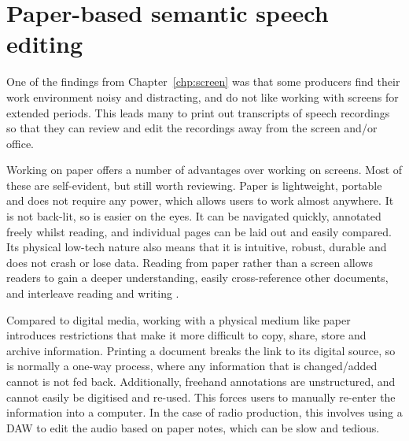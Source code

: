 \chapter{Paper-based semantic speech editing}\label{chp:paper}

One of the findings from Chapter~\ref{chp:screen} was that some producers find their work environment noisy and
distracting, and do not like working with screens for extended periods. This leads many to print out transcripts of
speech recordings so that they can review and edit the recordings away from the screen and/or office.

Working on paper offers a number of advantages over working on screens. Most of these are self-evident, but still
worth reviewing.  Paper is lightweight, portable and does not require any power, which allows users to work almost
anywhere.  It is not back-lit, so is easier on the eyes.  It can be navigated quickly, annotated freely whilst reading,
and individual pages can be laid out and easily compared.  Its physical low-tech nature also means that it is
intuitive, robust, durable and does not crash or lose data.  Reading from paper rather than a screen allows readers to
gain a deeper understanding, easily cross-reference other documents, and interleave reading and writing
\citep{OHara1997,Mangen2013,Singer2017}.



Compared to digital media, working with a physical medium like paper introduces restrictions that make it more
difficult to copy, share, store and archive information. Printing a document breaks the link to its digital source, so
is normally a one-way process, where any information that is changed/added cannot is not fed back. Additionally,
freehand annotations are unstructured, and cannot easily be digitised and re-used. This forces users to manually
re-enter the information into a computer. In the case of radio production, this involves using a DAW to edit the audio
based on paper notes, which can be slow and tedious.

